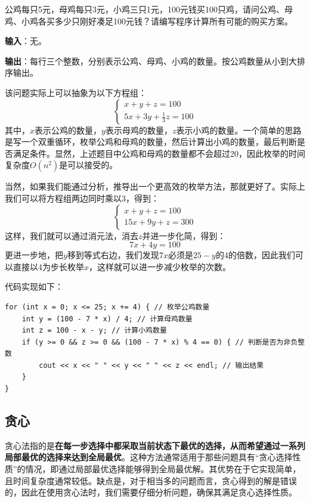 \begin{example}
    公鸡每只5元，母鸡每只3元，小鸡三只1元，100元钱买100只鸡，请问公鸡、母鸡、小鸡各买多少只刚好凑足100元钱？请编写程序计算所有可能的购买方案。

    \textbf{输入}：无。

    \textbf{输出}：每行三个整数，分别表示公鸡、母鸡、小鸡的数量。按公鸡数量从小到大排序输出。
\end{example}

\begin{answer}
    该问题实际上可以抽象为以下方程组：
    $$
    \begin{cases}
        x + y + z = 100 \\
        5x + 3y + \frac{1}{3}z = 100
    \end{cases}$$
    其中，$x$表示公鸡的数量，$y$表示母鸡的数量，$z$表示小鸡的数量。一个简单的思路是写一个双重循环，枚举公鸡和母鸡的数量，然后计算出小鸡的数量，最后判断是否满足条件。显然，上述题目中公鸡和母鸡的数量都不会超过20，因此枚举的时间复杂度$O(n^2)$是可以接受的。

    当然，如果我们能通过分析，推导出一个更高效的枚举方法，那就更好了。实际上我们可以将方程组两边同时乘以3，得到：
    $$
    \begin{cases}
        x + y + z = 100 \\
        15x + 9y + z = 300
    \end{cases}$$
    这样，我们就可以通过消元法，消去$z$并进一步化简，得到：
    $$7x + 4y = 100$$
    更进一步地，把$y$移到等式右边，我们发现$7x$必须是$25-y$的4的倍数，因此我们可以直接以4为步长枚举$x$，这样就可以进一步减少枚举的次数。

    代码实现如下：
\begin{verbatim}
for (int x = 0; x <= 25; x += 4) { // 枚举公鸡数量
    int y = (100 - 7 * x) / 4; // 计算母鸡数量
    int z = 100 - x - y; // 计算小鸡数量
    if (y >= 0 && z >= 0 && (100 - 7 * x) % 4 == 0) { // 判断是否为非负整数
        cout << x << " " << y << " " << z << endl; // 输出结果
    }
}
\end{verbatim}
\end{answer}

\subsection{贪心}

贪心法指的是\textbf{在每一步选择中都采取当前状态下最优的选择，从而希望通过一系列局部最优的选择来达到全局最优}。这种方法通常适用于那些问题具有“贪心选择性质”的情况，即通过局部最优选择能够得到全局最优解。其优势在于它实现简单，且时间复杂度通常较低。缺点是，对于相当多的问题而言，贪心得到的解是错误的，因此在使用贪心法时，我们需要仔细分析问题，确保其满足贪心选择性质。

